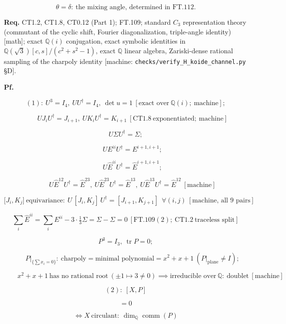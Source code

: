 \begin{theorem}
\[
\theta=\delta:\ \text{the mixing angle, determined in FT.112.}
\]

\textbf{Req.} CT1.2, CT1.8, CT0.12 (Part 1); FT.109; standard $C_3$ representation theory (commutant of the cyclic shift, Fourier diagonalization, triple-angle identity) [math]; exact $\mathbb Q(i)$ conjugation, exact symbolic identities in $\mathbb Q(\sqrt3)[c,s]/(c^2{+}s^2{-}1)$, exact $\mathbb Q$ linear algebra, Zariski-dense rational sampling of the charpoly identity [machine: \texttt{checks/\allowbreak{}verify\_\allowbreak{}H\_\allowbreak{}koide\_\allowbreak{}channel.py} §D].

\textbf{Pf.}

\[
(1):\ U^3=I_4,\ UU^\dagger=I_4,\ \det u=1\ [\text{exact over}\ \mathbb Q(i);\ \text{machine}];
\]

\[
\qquad UJ_iU^\dagger=J_{i+1},\ UK_iU^\dagger=K_{i+1}\ [\mathrm{CT1.8}\ \text{exponentiated};\ \text{machine}]
\]

\[
U\Sigma U^\dagger=\Sigma;
\]

\[
\qquad UE^{ii}U^\dagger=E^{i+1,i+1};
\]

\[
\qquad U\hat E^{ii}U^\dagger=\hat E^{i+1,i+1};
\]

\[
\qquad U\hat E^{12}U^\dagger=\hat E^{23},\ U\hat E^{23}U^\dagger=\hat E^{13},\ U\hat E^{13}U^\dagger=\hat E^{12}\ [\text{machine}]
\]

\[
\bigl[J_i,K_j\bigr]\ \text{equivariance}:\ U\,[J_i,K_j]\,U^\dagger=[J_{i+1},K_{j+1}]\ \ \forall(i,j)\ [\text{machine, all 9 pairs}]
\]

\[
\sum_i\hat E^{ii}=\sum_iE^{ii}-3\cdot\tfrac13\Sigma=\Sigma-\Sigma=0\ [\mathrm{FT.109}(2);\ \mathrm{CT1.2}\ \text{traceless split}]
\]

\[
P^3=I_3,\ \operatorname{tr}P=0;
\]

\[
\qquad P|_{\{\sum x_i=0\}}:\ \text{charpoly}=\text{minimal polynomial}=x^2+x+1\ (P|_{\text{plane}}\ne I);
\]

\[
\qquad x^2+x+1\ \text{has no rational root}\ (\pm1\mapsto3\ne0)\implies\text{irreducible over}\ \mathbb Q:\ \text{doublet}\ [\text{machine}]
\]

\[
(2):\ [X,P]
\]

\[
= 0
\]

\[
\iff X\ \text{circulant}:\ \dim_{\mathbb Q}\operatorname{comm}(P)
\]


\end{theorem}
